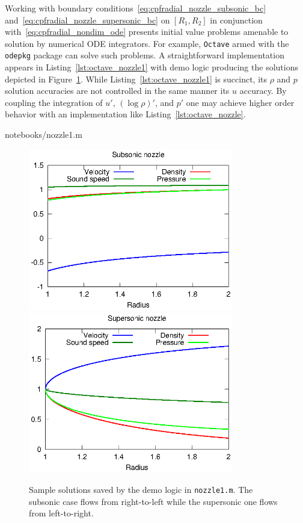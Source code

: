 \documentclass[letterpaper,11pt,nointlimits,reqno]{amsart}
\begin{document}
Working with boundary conditions~\eqref{eq:cpfradial_nozzle_subsonic_bc}
and~\eqref{eq:cpfradial_nozzle_supersonic_bc} on $\left[R_1, R_2\right]$ in
conjunction with~\eqref{eq:cpfradial_nondim_ode} presents initial value
problems amenable to solution by numerical ODE integrators.  For example,
\texttt{Octave}\citep{Eaton2008GNU} armed with the \texttt{odepkg} package can
solve such problems.  A straightforward implementation appears in
Listing~\ref{lst:octave_nozzle1} with demo logic producing the solutions
depicted in Figure~\ref{fig:sample_solns}.  While
Listing~\ref{lst:octave_nozzle1} is succinct, its $\rho$ and $p$ solution
accuracies are not controlled in the same manner its $u$ accuracy.  By coupling
the integration of $u'$, $\left(\log\rho\right)'$, and $p'$ one may achieve
higher order behavior with an implementation like
Listing~\ref{lst:octave_nozzle}.


                {notebooks/nozzle1.m}

\begin{figure}[p]
  \centering
  \includegraphics[width=0.80\textwidth]{nozzle_subsonic}
  \vfill
  \includegraphics[width=0.80\textwidth]{nozzle_supersonic}
  \caption{
      \label{fig:sample_solns}
      Sample solutions saved by the demo logic in \texttt{nozzle1.m}.  The
      subsonic case flows from right-to-left while the supersonic one flows
      from left-to-right.
  }
\end{figure}
\end{document}
